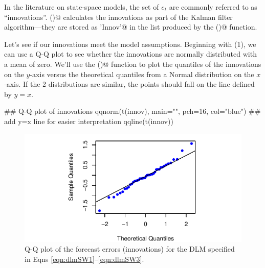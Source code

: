 \documentclass[10pt]{article}
\begin{document}
In the literature on state-space models, the set of $e_t$ are commonly referred to as ``innovations''. \verb@MARSS()@ calculates the innovations as part of the Kalman filter algorithm---they are stored as \verb@'Innov'@ in the list produced by the \verb@MARSSkfss()@ function.
\begin{Schunk}
\end{Schunk}

Let's see if our innovations meet the model assumptions. Beginning with (1), we can use a Q-Q plot to see whether the innovations are normally distributed with a mean of zero. We'll use the \verb@qqnorm()@ function to plot the quantiles of the innovations on the $y$-axis versus the theoretical quantiles from a Normal distribution on the $x$-axis. If the 2 distributions are similar, the points should fall on the line defined by $y = x$.
\begin{Schunk}
\begin{Sinput}
 ## Q-Q plot of innovations
 qqnorm(t(innov), main="", pch=16, col="blue")
 ## add y=x line for easier interpretation
 qqline(t(innov))
\end{Sinput}
\end{Schunk}
\begin{figure}[htp]
\begin{center}
\includegraphics{DLM_lab_5-plotdlmQQ}
\end{center}
\caption{Q-Q plot of the forecast errors (innovations) for the DLM specified in Eqns \ref{eqn:dlmSW1}--\ref{eqn:dlmSW3}.}
\label{fig:CSX.fig5}
\end{figure}
\end{document}
